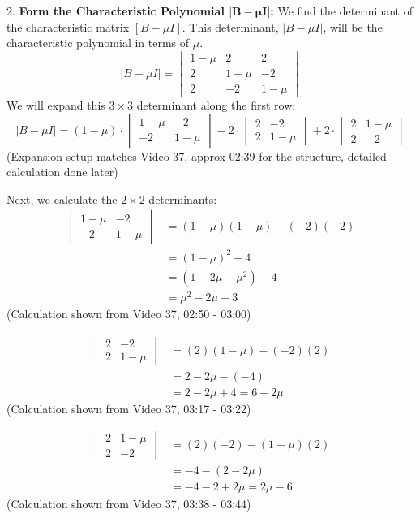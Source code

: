 \documentclass{article}
\begin{document}
2.  \textbf{Form the Characteristic Polynomial $\mathbf{|B - \mu I|}$:}
    We find the determinant of the characteristic matrix $[B - \mu I]$. This determinant, $|B - \mu I|$, will be the characteristic polynomial in terms of $\mu$.
    \[ |B - \mu I| = \begin{vmatrix} 1 - \mu & 2 & 2 \\ 2 & 1 - \mu & -2 \\ 2 & -2 & 1 - \mu \end{vmatrix} \]
    We will expand this $3 \times 3$ determinant along the first row:
    \[ |B - \mu I| = (1 - \mu) \cdot \begin{vmatrix} 1 - \mu & -2 \\ -2 & 1 - \mu \end{vmatrix} - 2 \cdot \begin{vmatrix} 2 & -2 \\ 2 & 1 - \mu \end{vmatrix} + 2 \cdot \begin{vmatrix} 2 & 1 - \mu \\ 2 & -2 \end{vmatrix} \]
    (Expansion setup matches Video 37, approx 02:39 for the structure, detailed calculation done later)

    Next, we calculate the $2 \times 2$ determinants:
    \begin{align*} \begin{vmatrix} 1 - \mu & -2 \\ -2 & 1 - \mu \end{vmatrix} &= (1 - \mu)(1 - \mu) - (-2)(-2) \\ &= (1 - \mu)^2 - 4 \\ &= (1 - 2\mu + \mu^2) - 4 \\ &= \mu^2 - 2\mu - 3 \end{align*}
    (Calculation shown from Video 37, 02:50 - 03:00)

    \begin{align*} \begin{vmatrix} 2 & -2 \\ 2 & 1 - \mu \end{vmatrix} &= (2)(1 - \mu) - (-2)(2) \\ &= 2 - 2\mu - (-4) \\ &= 2 - 2\mu + 4 = 6 - 2\mu \end{align*}
    (Calculation shown from Video 37, 03:17 - 03:22)

    \begin{align*} \begin{vmatrix} 2 & 1 - \mu \\ 2 & -2 \end{vmatrix} &= (2)(-2) - (1 - \mu)(2) \\ &= -4 - (2 - 2\mu) \\ &= -4 - 2 + 2\mu = 2\mu - 6 \end{align*}
    (Calculation shown from Video 37, 03:38 - 03:44)
\end{document}
